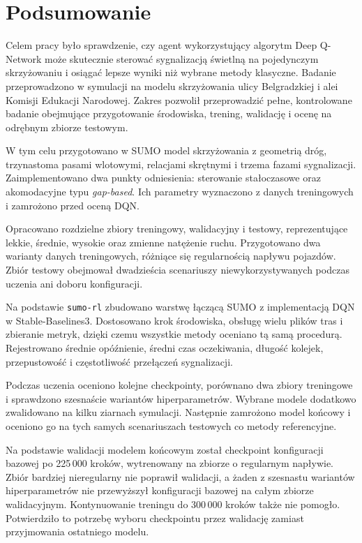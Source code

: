 \clearpage
\section{Podsumowanie}
\label{sec:podsumowanie}

Celem pracy było sprawdzenie, czy agent wykorzystujący algorytm Deep Q-Network może skutecznie sterować sygnalizacją świetlną na pojedynczym skrzyżowaniu i osiągać lepsze wyniki niż wybrane metody klasyczne. Badanie przeprowadzono w symulacji na modelu skrzyżowania ulicy Belgradzkiej i alei Komisji Edukacji Narodowej. Zakres pozwolił przeprowadzić pełne, kontrolowane badanie obejmujące przygotowanie środowiska, trening, walidację i ocenę na odrębnym zbiorze testowym.

\label{subsec:podsumowanie-prace}

W tym celu przygotowano w SUMO model skrzyżowania z geometrią dróg, trzynastoma pasami wlotowymi, relacjami skrętnymi i trzema fazami sygnalizacji. Zaimplementowano dwa punkty odniesienia: sterowanie stałoczasowe oraz akomodacyjne typu \textit{gap-based}. Ich parametry wyznaczono z danych treningowych i zamrożono przed oceną DQN.

Opracowano rozdzielne zbiory treningowy, walidacyjny i testowy, reprezentujące lekkie, średnie, wysokie oraz zmienne natężenie ruchu. Przygotowano dwa warianty danych treningowych, różniące się regularnością napływu pojazdów. Zbiór testowy obejmował dwadzieścia scenariuszy niewykorzystywanych podczas uczenia ani doboru konfiguracji.

Na podstawie \texttt{sumo-rl} zbudowano warstwę łączącą SUMO z implementacją DQN w Stable-Baselines3. Dostosowano krok środowiska, obsługę wielu plików tras i zbieranie metryk, dzięki czemu wszystkie metody oceniano tą samą procedurą. Rejestrowano średnie opóźnienie, średni czas oczekiwania, długość kolejek, przepustowość i częstotliwość przełączeń sygnalizacji.

Podczas uczenia oceniono kolejne checkpointy, porównano dwa zbiory treningowe i sprawdzono szesnaście wariantów hiperparametrów. Wybrane modele dodatkowo zwalidowano na kilku ziarnach symulacji. Następnie zamrożono model końcowy i oceniono go na tych samych scenariuszach testowych co metody referencyjne.

\label{subsec:podsumowanie-wyniki}

Na podstawie walidacji modelem końcowym został checkpoint konfiguracji bazowej po 225\,000 kroków, wytrenowany na zbiorze o regularnym napływie. Zbiór bardziej nieregularny nie poprawił walidacji, a żaden z szesnastu wariantów hiperparametrów nie przewyższył konfiguracji bazowej na całym zbiorze walidacyjnym. Kontynuowanie treningu do 300\,000 kroków także nie pomogło. Potwierdziło to potrzebę wyboru checkpointu przez walidację zamiast przyjmowania ostatniego modelu.

